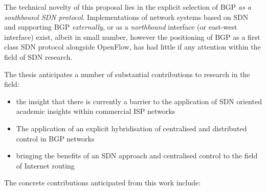 The technical novelty of this proposal lies in the explicit selection of BGP \textit{as a southbound SDN protocol}. Implementations of network systems based on SDN and supporting BGP \textit{externally}, or as a \textit{northbound }interface (or east-west interface) exist, albeit in small number, however the positioning of BGP as a first class SDN protocol alongside OpenFlow, has had little if any attention within the field of SDN research.

The thesis anticipates a number of substantial contributions to research in the field:

\begin{itemize}
	\item the insight that there is currently a barrier to the application of SDN oriented academic insights within commercial ISP networks
	\item The application of an explicit hybridisation of centralised and distributed control in BGP networks
	\item bringing the benefits of an SDN approach and centralised control to the field of Internet routing
\end{itemize}

The concrete contributions anticipated from this work include:

